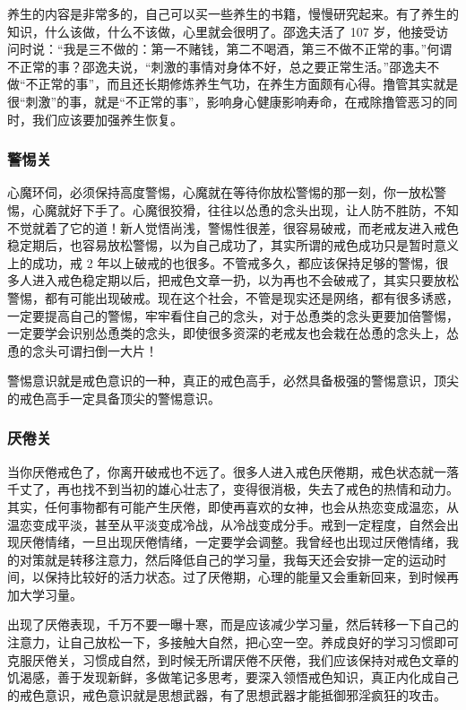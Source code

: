 \documentclass{ctexart}
\begin{document}
养生的内容是非常多的，自己可以买一些养生的书籍，慢慢研究起来。有了养生的知识，什么该做，什么不该做，心里就会很明了。邵逸夫活了 107 岁，他接受访问时说：“我是三不做的：第一不赌钱，第二不喝酒，第三不做不正常的事。”何谓不正常的事？邵逸夫说，“刺激的事情对身体不好，总之要正常生活。”邵逸夫不做“不正常的事”，而且还长期修炼养生气功，在养生方面颇有心得。撸管其实就是很“刺激”的事，就是“不正常的事”，影响身心健康影响寿命，在戒除撸管恶习的同时，我们应该要加强养生恢复。

\subsubsection{警惕关}

心魔环伺，必须保持高度警惕，心魔就在等待你放松警惕的那一刻，你一放松警惕，心魔就好下手了。心魔很狡猾，往往以怂恿的念头出现，让人防不胜防，不知不觉就着了它的道！新人觉悟尚浅，警惕性很差，很容易破戒，而老戒友进入戒色稳定期后，也容易放松警惕，以为自己成功了，其实所谓的戒色成功只是暂时意义上的成功，戒 2 年以上破戒的也很多。不管戒多久，都应该保持足够的警惕，很多人进入戒色稳定期以后，把戒色文章一扔，以为再也不会破戒了，其实只要放松警惕，都有可能出现破戒。现在这个社会，不管是现实还是网络，都有很多诱惑，一定要提高自己的警惕，牢牢看住自己的念头，对于怂恿类的念头更要加倍警惕，一定要学会识别怂恿类的念头，即使很多资深的老戒友也会栽在怂恿的念头上，怂恿的念头可谓扫倒一大片！

警惕意识就是戒色意识的一种，真正的戒色高手，必然具备极强的警惕意识，顶尖的戒色高手一定具备顶尖的警惕意识。

\subsubsection{厌倦关}

当你厌倦戒色了，你离开破戒也不远了。很多人进入戒色厌倦期，戒色状态就一落千丈了，再也找不到当初的雄心壮志了，变得很消极，失去了戒色的热情和动力。其实，任何事物都有可能产生厌倦，即使再喜欢的女神，也会从热恋变成温恋，从温恋变成平淡，甚至从平淡变成冷战，从冷战变成分手。戒到一定程度，自然会出现厌倦情绪，一旦出现厌倦情绪，一定要学会调整。我曾经也出现过厌倦情绪，我的对策就是转移注意力，然后降低自己的学习量，我每天还会安排一定的运动时间，以保持比较好的活力状态。过了厌倦期，心理的能量又会重新回来，到时候再加大学习量。

出现了厌倦表现，千万不要一曝十寒，而是应该减少学习量，然后转移一下自己的注意力，让自己放松一下，多接触大自然，把心空一空。养成良好的学习习惯即可克服厌倦关，习惯成自然，到时候无所谓厌倦不厌倦，我们应该保持对戒色文章的饥渴感，善于发现新鲜，多做笔记多思考，要深入领悟戒色知识，真正内化成自己的戒色意识，戒色意识就是思想武器，有了思想武器才能抵御邪淫疯狂的攻击。
\end{document}
